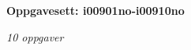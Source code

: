 \centerline{\bf Oppgavesett: i00901no-i00910no}
\vskip 10pt
\centerline{\it 10 oppgaver}\vskip 10pt
\vskip 10pt
